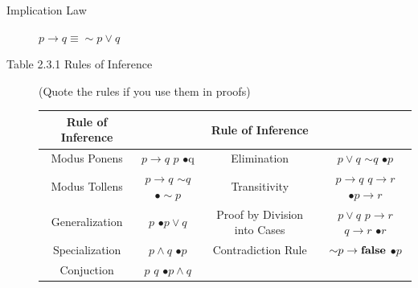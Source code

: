 \documentclass{article}
\begin{document}
\begin{description}
\begin{table}[h]
{\begin{tabular}{|c|c|c|c|}
            \hline
        \end{tabular}}
        \label{tab:1}
    \end{table}
    \item[Implication Law]$p\to q\equiv {\sim} p\vee q $ 
    \item[Table 2.3.1 Rules of Inference] (Quote the rules if you use them in proofs)
    \begin{table}[h]
    	\centering
		{
		\begin{tabular}{|c|c|c|c|} 
			\hline
			Rule of Inference & & Rule of Inference & \\
			\hline
			Modus Ponens & $p\to q$ \quad $p$ \quad $\bullet$q & Elimination & $p\lor q$ \quad ${\sim} q$ \quad $\bullet p$ \\
			Modus Tollens & $p\to q$ \quad ${\sim} q$ \quad $\bullet{\sim} p$ & Transitivity & $p\to q$ \quad $q\to r$ \quad $\bullet p\to r$ \\
			Generalization &  $p$ \quad $\bullet p\lor q$ & Proof by Division into Cases  & $p\lor q$ \quad $p\to r$ \quad $q\to r$ \quad $\bullet r$ \\
			Specialization &  $p\land q$ \quad $\bullet p$ & Contradiction Rule & ${\sim}{p}\to\text{\textbf{false}}$ \quad $\bullet p$ \\
			Conjuction & $p$ \quad $q$ \quad $\bullet p\land q$ & \ & \\
			\hline
		\end{tabular}}
		\label{tab:2}
    \end{table}
    

\end{description}
\end{document}
